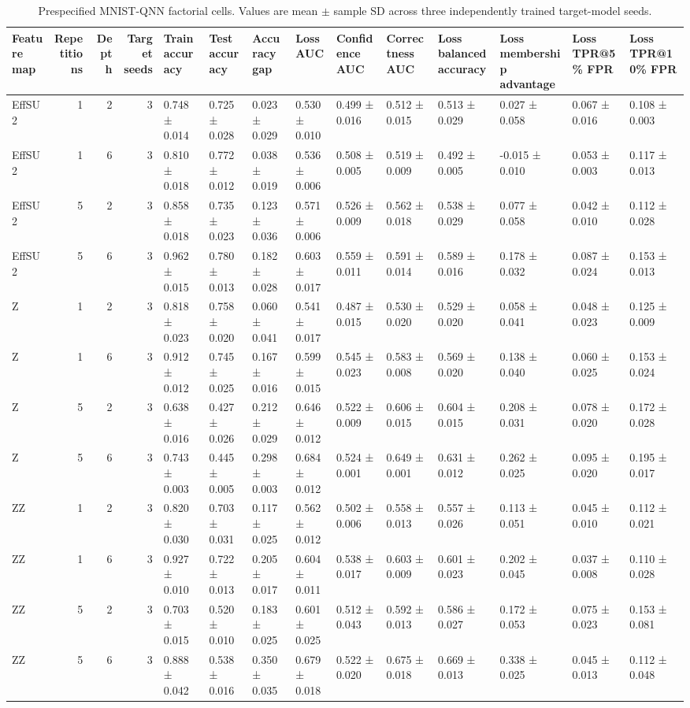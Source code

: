 \begin{table}[t]
\caption{Prespecified MNIST-QNN factorial cells. Values are mean $\pm$ sample SD across three independently trained target-model seeds.}
\label{tab:factorial-cells}
\begin{tabular}{lrrrllllllllll}
\toprule
Feature map & Repetitions & Depth & Target seeds & Train accuracy & Test accuracy & Accuracy gap & Loss AUC & Confidence AUC & Correctness AUC & Loss balanced accuracy & Loss membership advantage & Loss TPR@5\% FPR & Loss TPR@10\% FPR \\
\midrule
EffSU2 & 1 & 2 & 3 & 0.748 ± 0.014 & 0.725 ± 0.028 & 0.023 ± 0.029 & 0.530 ± 0.010 & 0.499 ± 0.016 & 0.512 ± 0.015 & 0.513 ± 0.029 & 0.027 ± 0.058 & 0.067 ± 0.016 & 0.108 ± 0.003 \\
EffSU2 & 1 & 6 & 3 & 0.810 ± 0.018 & 0.772 ± 0.012 & 0.038 ± 0.019 & 0.536 ± 0.006 & 0.508 ± 0.005 & 0.519 ± 0.009 & 0.492 ± 0.005 & -0.015 ± 0.010 & 0.053 ± 0.003 & 0.117 ± 0.013 \\
EffSU2 & 5 & 2 & 3 & 0.858 ± 0.018 & 0.735 ± 0.023 & 0.123 ± 0.036 & 0.571 ± 0.006 & 0.526 ± 0.009 & 0.562 ± 0.018 & 0.538 ± 0.029 & 0.077 ± 0.058 & 0.042 ± 0.010 & 0.112 ± 0.028 \\
EffSU2 & 5 & 6 & 3 & 0.962 ± 0.015 & 0.780 ± 0.013 & 0.182 ± 0.028 & 0.603 ± 0.017 & 0.559 ± 0.011 & 0.591 ± 0.014 & 0.589 ± 0.016 & 0.178 ± 0.032 & 0.087 ± 0.024 & 0.153 ± 0.013 \\
Z & 1 & 2 & 3 & 0.818 ± 0.023 & 0.758 ± 0.020 & 0.060 ± 0.041 & 0.541 ± 0.017 & 0.487 ± 0.015 & 0.530 ± 0.020 & 0.529 ± 0.020 & 0.058 ± 0.041 & 0.048 ± 0.023 & 0.125 ± 0.009 \\
Z & 1 & 6 & 3 & 0.912 ± 0.012 & 0.745 ± 0.025 & 0.167 ± 0.016 & 0.599 ± 0.015 & 0.545 ± 0.023 & 0.583 ± 0.008 & 0.569 ± 0.020 & 0.138 ± 0.040 & 0.060 ± 0.025 & 0.153 ± 0.024 \\
Z & 5 & 2 & 3 & 0.638 ± 0.016 & 0.427 ± 0.026 & 0.212 ± 0.029 & 0.646 ± 0.012 & 0.522 ± 0.009 & 0.606 ± 0.015 & 0.604 ± 0.015 & 0.208 ± 0.031 & 0.078 ± 0.020 & 0.172 ± 0.028 \\
Z & 5 & 6 & 3 & 0.743 ± 0.003 & 0.445 ± 0.005 & 0.298 ± 0.003 & 0.684 ± 0.012 & 0.524 ± 0.001 & 0.649 ± 0.001 & 0.631 ± 0.012 & 0.262 ± 0.025 & 0.095 ± 0.020 & 0.195 ± 0.017 \\
ZZ & 1 & 2 & 3 & 0.820 ± 0.030 & 0.703 ± 0.031 & 0.117 ± 0.025 & 0.562 ± 0.012 & 0.502 ± 0.006 & 0.558 ± 0.013 & 0.557 ± 0.026 & 0.113 ± 0.051 & 0.045 ± 0.010 & 0.112 ± 0.021 \\
ZZ & 1 & 6 & 3 & 0.927 ± 0.010 & 0.722 ± 0.013 & 0.205 ± 0.017 & 0.604 ± 0.011 & 0.538 ± 0.017 & 0.603 ± 0.009 & 0.601 ± 0.023 & 0.202 ± 0.045 & 0.037 ± 0.008 & 0.110 ± 0.028 \\
ZZ & 5 & 2 & 3 & 0.703 ± 0.015 & 0.520 ± 0.010 & 0.183 ± 0.025 & 0.601 ± 0.025 & 0.512 ± 0.043 & 0.592 ± 0.013 & 0.586 ± 0.027 & 0.172 ± 0.053 & 0.075 ± 0.023 & 0.153 ± 0.081 \\
ZZ & 5 & 6 & 3 & 0.888 ± 0.042 & 0.538 ± 0.016 & 0.350 ± 0.035 & 0.679 ± 0.018 & 0.522 ± 0.020 & 0.675 ± 0.018 & 0.669 ± 0.013 & 0.338 ± 0.025 & 0.045 ± 0.013 & 0.112 ± 0.048 \\
\bottomrule
\end{tabular}
\end{table}
